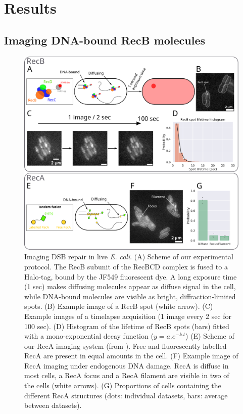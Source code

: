 \section*{Results}

\subsection*{Imaging DNA-bound RecB molecules}

\begin{figure}[htbp]
\begin{center}
\includegraphics[width=\textwidth]{Figures/Fig1_endogenous.pdf}
\end{center}
\caption{Imaging DSB repair in live \textit{E. coli}. (A) Scheme of our experimental protocol. The RecB subunit of the RecBCD complex is fused to a Halo-tag, bound by the JF549 fluorescent dye. A long exposure time (1 sec) makes diffusing molecules appear as diffuse signal in the cell, while DNA-bound molecules are visible as bright, diffraction-limited spots. (B) Example image of a RecB spot (white arrow). (C) Example images of a timelapse acquisition (1 image every 2 sec for 100 sec). (D) Histogram of the lifetime of RecB spots (bars) fitted with a mono-exponential decay function ($y=a.e^{-k.t}$) (E) Scheme of our RecA imaging system (from \cite{Wiktor2021}). Free and fluorescently labelled RecA are present in equal amounts in the cell. (F) Example image of RecA imaging under endogenous DNA damage. RecA is diffuse in most cells, a RecA focus and a RecA filament are visible in two of the cells (white arrows). (G) Proportions of cells containing the different RecA structures (dots: individual datasets, bars: average between datasets).}
\label{Fig:endogenous}
\end{figure}


